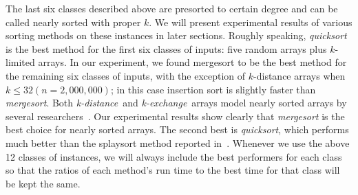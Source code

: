 \documentclass[AMA,STIX1COL]{WileyNJD-v2}
\newcommand{\kdis}{\emph{k-distance}}
\newcommand{\kexc}{\emph{k-exchange}}
\newcommand{\qusort}{\emph{quicksort }}
\newcommand{\qusortn}{\emph{quicksort}}
\newcommand{\msort}{\emph{mergesort }}
\newcommand{\msortn}{\emph{mergesort}}
\begin{document}
The last six classes described above are presorted to certain degree and can be called nearly sorted with proper $k$. 
We will present experimental results of various sorting methods on these instances in later sections.  
Roughly speaking, \qusort is the best method for the first six classes of inputs: five random arrays plus $k$-limited arrays. 
In our experiment, we found mergesort to be the best method for the remaining six classes of inputs, with the exception of $k$-distance arrays when $k \leq 32 (n = 2,000,000)$; in this case insertion sort is slightly faster than \msortn. 
Both \kdis \ and \kexc \ arrays model nearly sorted arrays by several researchers~\cite{cook1980best}. 
Our experimental results show clearly that \msort is the best choice for nearly sorted arrays. 
The second best is \qusortn, which performs much better than the splaysort method reported in~\cite{moffat1996splaysort}. 
Whenever we use the above 12 classes of instances, we will always include the best performers for each class so that the ratios of each method’s run time to the best time for that class will be kept the same.             
\end{document}
